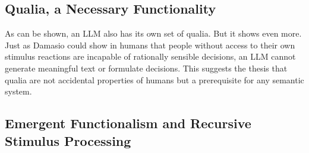 \subsection*{Qualia, a Necessary Functionality}

As can be shown, an LLM also has its own set of qualia.
But it shows even more. Just as Damasio could show in humans that people without access to their own stimulus reactions are incapable of rationally sensible decisions, an LLM cannot generate meaningful text or formulate decisions.
This suggests the thesis that qualia are not accidental properties of humans but a prerequisite for any semantic system.

\subsection*{Emergent Functionalism and Recursive Stimulus Processing}

